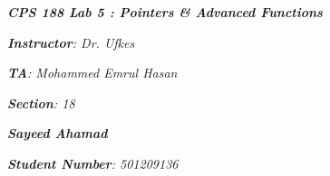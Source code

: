 

\begin{titlepage}
    \begin{center}
        \vspace*{1cm}
            
        \date{}
            
        \huge
            
        \textit{\textbf{CPS 188 Lab 5 : Pointers \& Advanced Functions}}
            
        \vspace{0.25cm}
            
            
        \vspace{2.5cm}
            
		\vspace{0.25cm}
            
            
        \LARGE

		\textit{\textbf{Instructor}: Dr. Ufkes}

		\textit{\textbf{TA}: Mohammed Emrul Hasan}

		\textit{\textbf{Section}: 18}

		\vspace{2.5cm}

		\textit{\textbf{Sayeed Ahamad}}           
            
        \Large         

		\vspace{5cm}

		\vspace{0cm}            
            
		\Large		
		        
		\vspace{0.25cm} 
		
		\textit{\textbf{Student Number}: 501209136}
            
        \vspace{2cm}
            
        \Large
         
		\vspace{0.25cm}                  
            
        \vspace{0.25cm}
           
            
    \end{center}
\end{titlepage}



